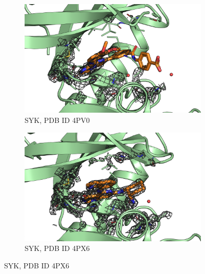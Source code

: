 \documentclass[9pt,bestpractices]{livecoms}
\begin{document}
\begin{figure}
    \begin{subfigure}[b]{0.48\textwidth}
        \centering
        \includegraphics[width=\textwidth]{figures/crystal/pic_4pv0.png}
        \caption{SYK, PDB ID 4PV0}
        \label{fig:4pv0}
    \end{subfigure}
    \hfill
    \begin{subfigure}[b]{0.48\textwidth}
        \centering
        \includegraphics[width=\textwidth]{figures/crystal/pic_4px6.png}
        \caption{SYK, PDB ID 4PX6}
        \label{fig:4px6}
    \end{subfigure} 
    

\end{figure}
\end{document}
